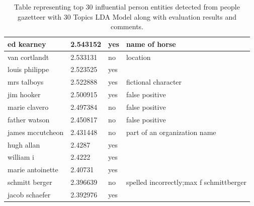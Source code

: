 \documentclass[10pt,journal,compsoc]{IEEEtran}
\begin{document}
\begin{table}
\begin{tabular}{|l|l|p{3cm}|p{3cm}|}
ed kearney       & 2.543152 & yes                & name of horse                        \\ \hline
van cortlandt    & 2.533131 & no                 & location                             \\ \hline
louis philippe   & 2.523525 & yes                &                                      \\ \hline
mrs talboys      & 2.522888 & yes                & fictional character                  \\ \hline
jim hooker       & 2.500915 & yes                & false positive                       \\ \hline
marie clavero    & 2.497384 & no                 & false positive                       \\ \hline
father watson    & 2.450817 & no                 & false positive                       \\ \hline
james mccutcheon & 2.431448 & no                 & part of an organization name                      \\ \hline
hugh allan       & 2.4287   & yes                &                                      \\ \hline
william i        & 2.4222   & yes                &                                      \\ \hline
marie antoinette & 2.40731  & yes                &                                      \\ \hline
schmitt berger   & 2.396639 & no                 & spelled incorrectly;max f schmittberger                       \\ \hline
jacob schaefer   & 2.392976 & yes                &                                      \\ \hline
             
\end{tabular}
\caption{Table representing top 30 influential person entities detected from people gazetteer with 30 Topics LDA Model along with evaluation results and comments.}
\label{table:app1}
\end{table}
\end{document}
